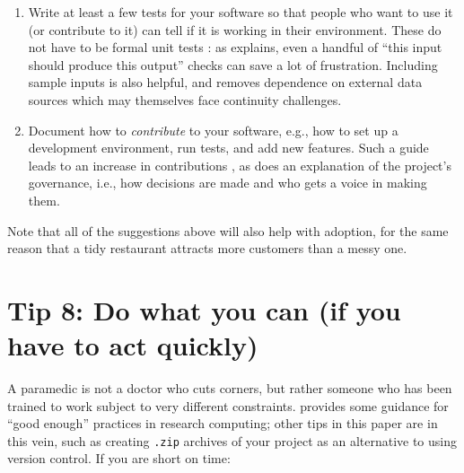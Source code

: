 \documentclass[10pt,letterpaper]{article}
\begin{document}
\begin{enumerate}
\item
  Write at least a few tests for your software so that people who want to use it (or contribute to it) can tell if it is working in their environment.
  These do not have to be formal unit tests \cite{Irving2021}: as \cite{Taschuk2017} explains, even a handful of ``this input should produce this output'' checks can save a lot of frustration.
  Including sample inputs is also helpful, and removes dependence on external data sources which may themselves face continuity challenges.

\item
  Document how to \emph{contribute} to your software, e.g., how to set up a development environment,
  run tests, and add new features. Such a guide leads to an increase in contributions \cite{Sholler2019}, as does an explanation of the project's governance, i.e., how decisions are made and who gets a voice in making them.

\end{enumerate}

Note that all of the suggestions above will also help with adoption,
for the same reason that a tidy restaurant attracts more customers than a messy one.

\section*{Tip 8: Do what you can (if you have to act quickly)}

A paramedic is not a doctor who cuts corners,
but rather someone who has been trained to work subject to very different constraints.
\cite{Wilson2017} provides some guidance for ``good enough'' practices in research computing;
other tips in this paper are in this vein,
such as creating \texttt{.zip} archives of your project as an alternative to using version control.
If you are short on time:
\end{document}
